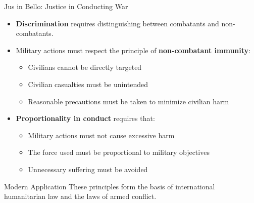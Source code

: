 \documentclass{beamer}
\begin{document}
\begin{frame}{Jus in Bello: Justice in Conducting War}
    \begin{itemize}
        \item \textbf{Discrimination} requires distinguishing between combatants and non-combatants.
        
        \item Military actions must respect the principle of \textbf{non-combatant immunity}:
        \begin{itemize}
            \item Civilians cannot be directly targeted
            \item Civilian casualties must be unintended
            \item Reasonable precautions must be taken to minimize civilian harm
        \end{itemize}
        
        \item \textbf{Proportionality in conduct} requires that:
        \begin{itemize}
            \item Military actions must not cause excessive harm
            \item The force used must be proportional to military objectives
            \item Unnecessary suffering must be avoided
        \end{itemize}
    \end{itemize}
    
    \begin{alertblock}{Modern Application}
        These principles form the basis of international humanitarian law and the laws of armed conflict.
    \end{alertblock}
\end{frame}
\end{document}
